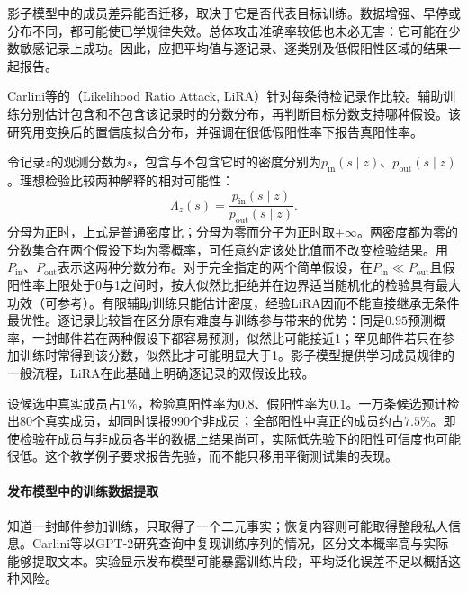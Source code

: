 影子模型中的成员差异能否迁移，取决于它是否代表目标训练。数据增强、早停或分布不同，都可能使已学规律失效。总体攻击准确率较低也未必无害：它可能在少数敏感记录上成功。因此，应把平均值与逐记录、逐类别及低假阳性区域的结果一起报告。

Carlini等的（Likelihood Ratio Attack, LiRA）针对每条待检记录作比较。辅助训练分别估计包含和不包含该记录时的分数分布，再判断目标分数支持哪种假设。该研究用变换后的置信度拟合分布，并强调在很低假阳性率下报告真阳性率。

令记录$z$的观测分数为$s$，包含与不包含它时的密度分别为$p_{\mathrm{in}}(s\mid z)$、$p_{\mathrm{out}}(s\mid z)$。理想检验比较两种解释的相对可能性：
\begin{equation}
 \Lambda_z(s)=
 \frac{p_{\mathrm{in}}(s\mid z)}
      {p_{\mathrm{out}}(s\mid z)}.
 \label{eq:privacy-membership-likelihood}
\end{equation}
分母为正时，上式是普通密度比；分母为零而分子为正时取$+\infty$。两密度都为零的分数集合在两个假设下均为零概率，可任意约定该处比值而不改变检验结果。用$P_{\mathrm{in}}$、$P_{\mathrm{out}}$表示这两种分数分布。对于完全指定的两个简单假设，在$P_{\mathrm{in}}\ll P_{\mathrm{out}}$且假阳性率上限处于0与1之间时，按大似然比拒绝并在边界适当随机化的检验具有最大功效（可参考）。有限辅助训练只能估计密度，经验LiRA因而不能直接继承无条件最优性。逐记录比较旨在区分原有难度与训练参与带来的优势：同是$0.95$预测概率，一封邮件若在两种假设下都容易预测，似然比可能接近1；罕见邮件若只在参加训练时常得到该分数，似然比才可能明显大于1。影子模型提供学习成员规律的一般流程，LiRA在此基础上明确逐记录的双假设比较。

\begin{example}[成员先验改变结果的含义]
\label{ex:privacy-membership-prior}
设候选中真实成员占$1\%$，检验真阳性率为$0.8$、假阳性率为$0.1$。一万条候选预计检出80个真实成员，却同时误报990个非成员；全部阳性中真正的成员约占$7.5\%$。即使检验在成员与非成员各半的数据上结果尚可，实际低先验下的阳性可信度也可能很低。这个教学例子要求报告先验，而不能只移用平衡测试集的表现。
\end{example}

\paragraph{发布模型中的训练数据提取}

知道一封邮件参加训练，只取得了一个二元事实；恢复内容则可能取得整段私人信息。Carlini等以GPT-2研究查询中复现训练序列的情况，区分文本概率高与实际能够提取文本。实验显示发布模型可能暴露训练片段，平均泛化误差不足以概括这种风险。

